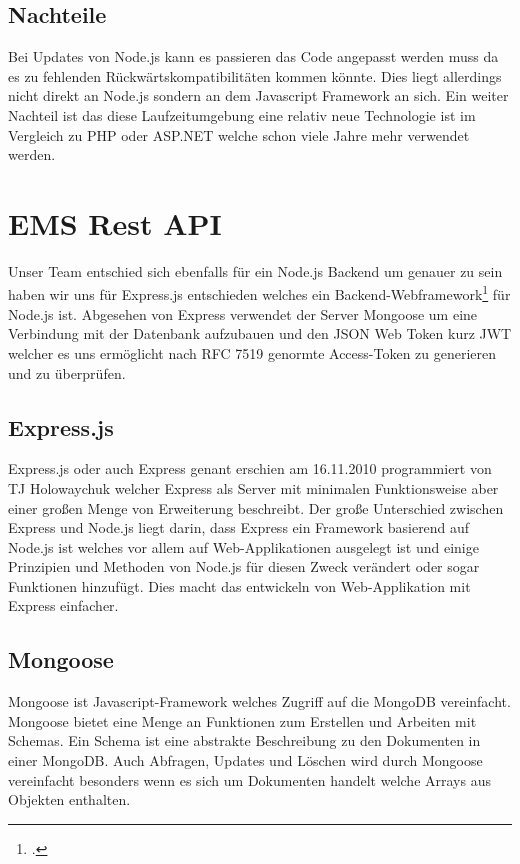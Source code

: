 		 	\subsection{Nachteile}
		 		Bei Updates von Node.js kann es passieren das Code angepasst werden muss da es zu fehlenden Rückwärtskompatibilitäten kommen könnte. Dies liegt allerdings nicht direkt an Node.js sondern an dem Javascript Framework an sich. Ein weiter Nachteil ist das diese Laufzeitumgebung eine relativ neue Technologie ist im Vergleich zu PHP oder ASP.NET welche schon viele Jahre mehr verwendet werden. 		 		
		 \section{EMS Rest API} 
		 	Unser Team entschied sich ebenfalls für ein Node.js Backend um genauer zu sein haben wir uns für Express.js entschieden welches ein Backend-Webframework\footcite{web-token} für Node.js ist. Abgesehen von Express verwendet der Server Mongoose um eine Verbindung mit der Datenbank aufzubauen und den JSON Web Token kurz JWT welcher es uns ermöglicht nach RFC 7519 genormte Access-Token zu generieren und zu überprüfen. 		 	
		 	\subsection{Express.js}
		 	 	Express.js oder auch Express genant erschien am 16.11.2010 programmiert von TJ Holowaychuk welcher Express als Server mit minimalen Funktionsweise aber einer großen Menge von Erweiterung beschreibt. Der große Unterschied zwischen Express und Node.js liegt darin, dass Express ein Framework basierend auf Node.js ist welches vor allem auf Web-Applikationen ausgelegt ist und einige Prinzipien und Methoden von Node.js für diesen Zweck verändert oder sogar Funktionen hinzufügt. Dies macht das entwickeln von Web-Applikation mit Express einfacher. 	
		 	\subsection{Mongoose}
		 		Mongoose ist Javascript-Framework welches Zugriff auf die MongoDB vereinfacht. Mongoose bietet eine Menge an Funktionen zum Erstellen und Arbeiten mit Schemas. Ein Schema ist eine abstrakte Beschreibung zu den Dokumenten in einer MongoDB. Auch Abfragen, Updates und Löschen wird durch Mongoose vereinfacht besonders wenn es sich um Dokumenten handelt welche Arrays aus Objekten enthalten. 		 	
